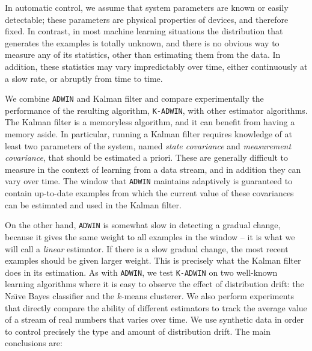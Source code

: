 In automatic control, we assume that system parameters are known or easily detectable; 
these parameters are physical properties of devices, and therefore fixed. 
In contrast, in most machine learning situations the distribution that generates the examples
is totally unknown, and there is no obvious way to measure any of its statistics, 
other than estimating them from the data. In addition, these statistics 
may vary impredictably over time, either continuously at a slow rate, or abruptly from time to time. 

We combine {\tt ADWIN} and Kalman filter and
compare experimentally the performance of the resulting algorithm, 
{\tt K-ADWIN}, with other estimator algorithms. %
\BEGINOMIT
The Kalman filter is a memoryless algorithm, and it can benefit from having
a memory aside. In particular, running a Kalman filter requires
knowledge of at least two parameters of the system, named
{\em state covariance} and {\em measurement covariance}, that should
be estimated a priori. These are generally difficult to measure in the context
of learning from a data stream, and in addition they can vary over time. 
The window that {\tt ADWIN} maintains adaptively is guaranteed
to contain up-to-date examples from which the current value of
these covariances can be estimated and used in the Kalman filter. 

On the other hand, {\tt ADWIN} is somewhat slow in detecting
a gradual change, because it gives the same weight
to all examples in the window -- it is what we will call a {\em linear}
estimator. If there is a slow gradual change, 
the most recent examples should be given larger weight. This is
precisely what the Kalman filter does in its estimation. 
\ENDOMIT
As with {\tt ADWIN}, we test {\tt K-ADWIN} on two well-known learning 
algorithms where it is easy to observe the effect of distribution drift:
the Na\"\i ve Bayes classifier and the $k$-means
clusterer.
\BEGINOMIT
 We also perform experiments that directly compare the ability
of different estimators to track the average value of a stream of real numbers
that varies over time. 
We use synthetic data in order to control precisely
the type and amount of distribution drift. The main conclusions are: 

